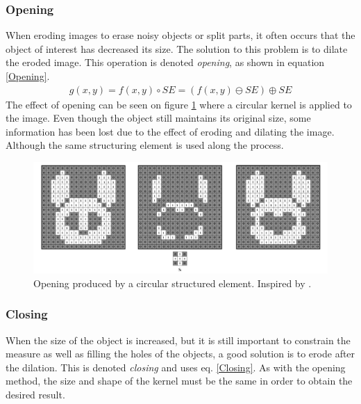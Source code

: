 \subsubsection{Opening}
When eroding images to erase noisy objects or split parts, it often occurs that the object of interest has decreased its size. The solution to this problem is to dilate the eroded image. This operation is denoted \textit{opening}, as shown in equation \ref{Opening}.
\begin{equation}
\begin{aligned}
{g(x,y)}={f(x,y)}\circ{SE}=({f(x,y)}\ominus{SE})\oplus{SE}
\label{Opening}
	\end{aligned}
\end{equation}
The effect of opening can be seen on figure \ref{fig:Opening} where a circular kernel is applied to the image. Even though the object still maintains its original size, some information has been lost due to the effect of eroding and dilating the image. Although the same structuring element is used along the process.

\begin{figure}[htbp]
\centering
\includegraphics[width=1\textwidth]{Pictures/Theory/OpeningCirc.png}
\caption{Opening produced by a circular structured element. Inspired by \citep{ip_book}.}
\label{fig:Opening}
\end{figure}

\subsubsection{Closing}\label{closing}
When the size of the object is increased, but it is still important to constrain the measure as well as filling the holes of the objects, a good solution is to erode after the dilation. This is denoted \textit{closing} and uses eq. \ref{Closing}. As with the opening method, the size and shape of the kernel must be the same in order to obtain the desired result.

